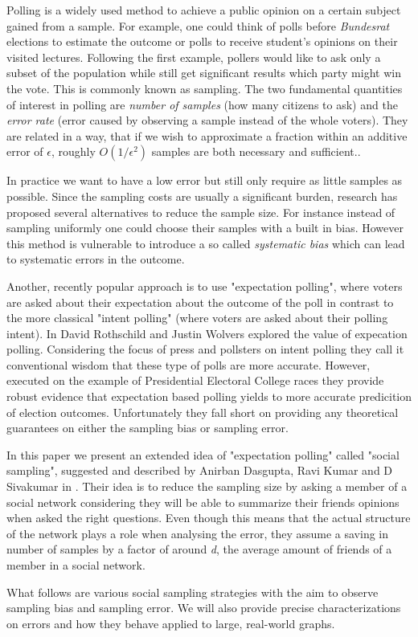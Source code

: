 Polling is a widely used method to achieve a public opinion on a certain subject gained from a sample. For example, one could think of polls before \textit{Bundesrat} elections to estimate the outcome or polls to receive student's opinions on their visited lectures.
Following the first example, pollers would like to ask only a subset of the population while still get significant results which party might win the vote. This is commonly known as sampling.
The two fundamental quantities of interest in polling are \textit{number of samples} (how many citizens to ask) and the \textit{error rate} (error caused by observing a sample instead of the whole voters). They are related in a way, that if we wish to approximate a fraction within an additive error of $\epsilon$, roughly $O(1/\epsilon^{2})$ samples are both necessary and sufficient..

In practice we want to have a low error but still only require as little samples as possible.
Since the sampling costs are usually a significant burden, research has proposed several alternatives to reduce the sample size.
For instance instead of sampling uniformly one could choose their samples with a built in bias.
However this method is vulnerable to introduce a so called \textit{systematic bias} which can lead to systematic errors in the outcome.

Another, recently popular approach is to use "expectation polling", where voters are asked about their expectation about the outcome of the poll in contrast to the more classical "intent polling" (where voters are asked about their polling intent). In \cite{rothschild2009forecasting} David Rothschild and Justin Wolvers explored the value of expecation polling. Considering the focus of press and pollsters on intent polling they call it conventional wisdom that these type of polls are more accurate. However, executed on the example of Presidential Electoral College races they provide robust evidence that expectation based polling yields to more accurate predicition of election outcomes.
Unfortunately they fall short on providing any theoretical guarantees on either the sampling bias or sampling error.

In this paper we present an extended idea of "expectation polling" called "social sampling", suggested and described by Anirban Dasgupta, Ravi Kumar and D Sivakumar in \cite{dasgupta2012social}.
Their idea is to reduce the sampling size by asking a member of a social network considering they will be able to summarize their friends opinions when asked the right questions.
Even though this means that the actual structure of the network plays a role when analysing the error, they assume a saving in number of samples by a factor of around \textit{d}, the average amount of friends of a member in a social network.

What follows are various social sampling strategies with the aim to observe sampling bias and sampling error.
We will also provide precise characterizations on errors and how they behave applied to large, real-world graphs.
